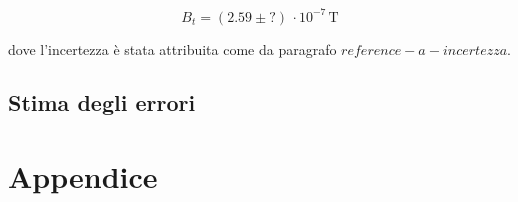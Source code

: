 \documentclass[]{article}
\let\oldsection\section%
\renewcommand{\section}{%
	\renewcommand{\theequation}{\thesection.\arabic{equation}}%
	\oldsection}%
\let\oldsubsection\subsection%
\renewcommand{\subsection}{%
	\renewcommand{\theequation}{\thesubsection.\arabic{equation}}%
	\oldsubsection}%
\begin{document}
    
    \begin{equation}
        \label{misura_campomagneticoterrestre}
        B_t = ( 2.59\pm ?) \, \cdot 10^{-7} \, \text{T}
    \end{equation}

    dove l'incertezza è stata attribuita come da paragrafo $reference-a-incertezza$.

    \label{par:campo_magnetico_terrestre}


    \subsection {Stima degli errori}



    \newpage
    \section{Appendice}
\end{document}
